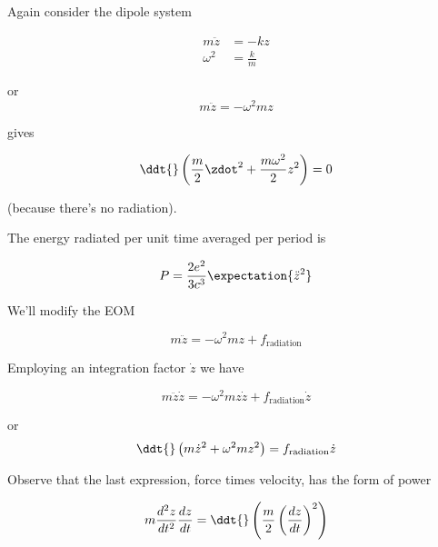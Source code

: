 Again consider the dipole system

\begin{align}\label{eqn:relativisticElectrodynamicsL26:110}
m \ddot{z} &= -k z \\
\omega^2 &= \frac{k}{m}
\end{align}

or
\begin{equation}\label{eqn:relativisticElectrodynamicsL26:130}
m \ddot{z} = -\omega^2 m z
\end{equation}

gives

\begin{equation}\label{eqn:relativisticElectrodynamicsL26:150}
\ddt{}\left( \frac{m}{2} \zdot^2 + \frac{ m \omega^2 }{2} z^2 \right) = 0 
\end{equation}

(because there's no radiation).

The energy radiated per unit time averaged per period is

\begin{equation}\label{eqn:relativisticElectrodynamicsL26:170}
P = \frac{ 2 e^2 }{ 3 c^3} \expectation{ \ddot{z}^2 }
\end{equation}

We'll modify the EOM

\begin{equation}\label{eqn:relativisticElectrodynamicsL26:190}
m \ddot{z} = -\omega^2 m z + f_{\text{radiation}}
\end{equation}

Employing an integration factor $\dot{z}$ we have

\begin{equation}\label{eqn:relativisticElectrodynamicsL26:210}
m \ddot{z} \dot{z} = -\omega^2 m z \dot{z} + f_{\text{radiation}} \dot{z}
\end{equation}

or
\begin{equation}\label{eqn:relativisticElectrodynamicsL26:230}
\ddt{} 
\left( m \dot{z}^2 + \omega^2 m z^2 \right) 
= 
f_{\text{radiation}} \dot{z}
\end{equation}

Observe that the last expression, force times velocity, has the form of power

\begin{equation}\label{eqn:relativisticElectrodynamicsL26:250}
m \frac{d^2 z}{dt^2} \frac{dz}{dt} = \ddt{} \left( \frac{m}{2} \left( \frac{dz}{dt} \right)^2 \right)
\end{equation}

